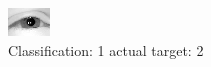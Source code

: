 \begin{figure}[h!]
\begin{center}
\includegraphics[width=0.60\columnwidth]{figures/ID2269_class_1_target_2.png}
\end{center}
\caption{ Classification: 1 actual target: 2}
\label{fig:ID2269_class_1_target_2}
\end{figure}
